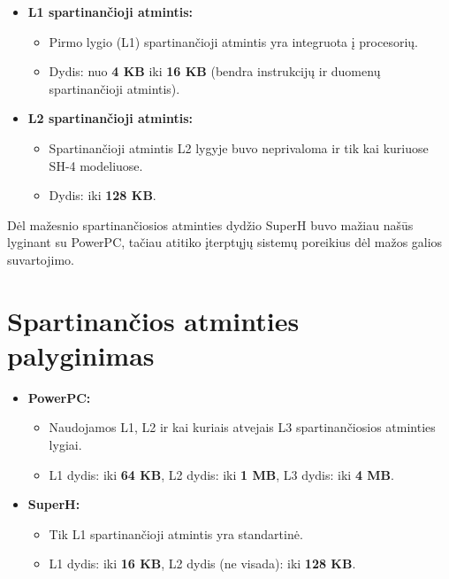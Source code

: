 \documentclass{article}
\begin{document}
\begin{itemize}
    \item \textbf{L1 spartinančioji atmintis:}
        \begin{itemize}
            \item Pirmo lygio (L1) spartinančioji atmintis yra integruota į procesorių.
            \item Dydis: nuo \textbf{4 KB} iki \textbf{16 KB} (bendra instrukcijų ir duomenų spartinančioji atmintis).
        \end{itemize}
    \item \textbf{L2 spartinančioji atmintis:}
        \begin{itemize}
            \item Spartinančioji atmintis L2 lygyje buvo neprivaloma ir tik kai kuriuose SH-4 modeliuose.
            \item Dydis: iki \textbf{128 KB}.
        \end{itemize}
\end{itemize}

Dėl mažesnio spartinančiosios atminties dydžio SuperH buvo mažiau našūs lyginant su PowerPC, tačiau atitiko įterptųjų sistemų poreikius dėl mažos galios suvartojimo.

\section*{Spartinančios atminties palyginimas}
\begin{itemize}
    \item \textbf{PowerPC:}
        \begin{itemize}
            \item Naudojamos L1, L2 ir kai kuriais atvejais L3 spartinančiosios atminties lygiai.
            \item L1 dydis: iki \textbf{64 KB}, L2 dydis: iki \textbf{1 MB}, L3 dydis: iki \textbf{4 MB}.
        \end{itemize}
    \item \textbf{SuperH:}
        \begin{itemize}
            \item Tik L1 spartinančioji atmintis yra standartinė.
            \item L1 dydis: iki \textbf{16 KB}, L2 dydis (ne visada): iki \textbf{128 KB}.
        \end{itemize}
\end{itemize}


 
\end{document}

